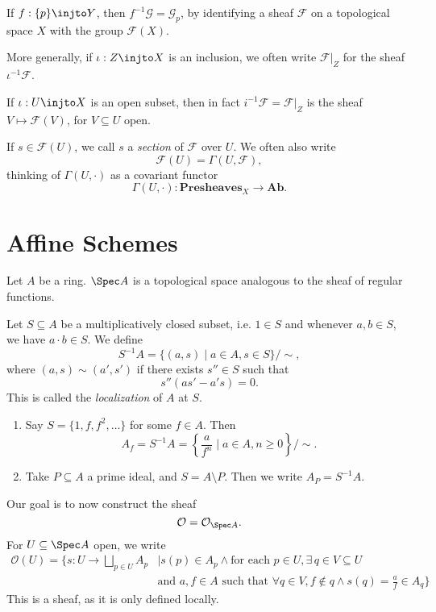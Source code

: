 \documentclass[12pt]{article}
\begin{document}
\begin{exbox}
	If $f : \{p\} \injto Y$, then $f^{-1} \mathcal{G} = \mathcal{G}_p$, by identifying a sheaf $\mathcal{F}$ on a topological space $X$ with the group $\mathcal{F}(X)$.

	More generally, if $\iota : Z \injto X$ is an inclusion, we often write $\mathcal{F}|_Z$ for the sheaf $\iota^{-1} \mathcal{F}$.

	If $\iota : U \injto X$ is an open subset, then in fact $i^{-1} \mathcal{F} = \mathcal{F}|_Z$ is the sheaf $V \mapsto \mathcal{F}(V)$, for $V \subseteq U$ open.
\end{exbox}

If $s \in \mathcal{F}(U)$, we call $s$ a \emph{section} of $\mathcal{F}$ over $U$. We often also write
\[
\mathcal{F}(U) = \Gamma(U, \mathcal{F}),
\]
thinking of $\Gamma(U, \cdot)$ as a covariant functor
\[
\Gamma(U, \cdot) : \mathbf{Presheaves}_X \to \mathbf{Ab}.
\]

\newpage

\section{Affine Schemes}%
\label{sec:as}

Let $A$ be a ring. $\Spec A$ is a topological space analogous to the sheaf of regular functions.

Let $S \subseteq A$ be a multiplicatively closed subset, i.e. $1 \in S$ and whenever $a, b \in S$, we have $a \cdot b \in S$. We define
\[
	S^{-1}A = \{(a, s) \mid a \in A, s \in S\} / \sim,
\]
where $(a, s) \sim (a', s')$ if there exists $s'' \in S$ such that
\[
s''(as' - a's) = 0.
\]
This is called the \emph{localization} of $A$ at $S$.

\begin{exbox}
	\begin{enumerate}
		\item Say $S = \{1, f, f^2, \ldots\}$ for some $f \in A$. Then
			\[
				A_f = S^{-1} A = \left\{ \frac{a}{f^n} \mid a \in A, n \geq 0\right\} / \sim.
			\]
		\item Take $P \subseteq A$ a prime ideal, and $S = A \setminus P$. Then we write $A_P = S^{-1} A$.
	\end{enumerate}
\end{exbox}

Our goal is to now construct the sheaf
\[
\mathcal{O} = \mathcal{O}_{\Spec A}.
\]
For $U \subseteq \Spec A$ open, we write
\begin{align*}
	\mathcal{O}(U) = \biggl\{ s : U \to \bigsqcup_{p \in U} A_p &\mid s(p) \in A_p \wedge \text{for each } p \in U, \exists \, q \in V \subseteq U \\
								    & \text{and }a, f \in A \text{ such that } \forall q \in V, f \not \in q \wedge s(q) = \frac{a}{f} \in A_q \biggr\}
\end{align*}
This is a sheaf, as it is only defined locally.
\end{document}
